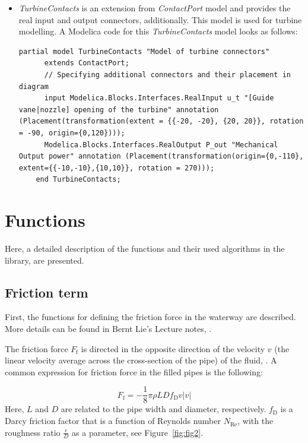 \documentclass[%
]{USN-PhD}
\begin{document}
\begin{itemize}
    \item \emph{TurbineContacts} is an extension from \emph{ContactPort} model and provides the real input and output connectors, additionally. This model is used for turbine modelling. A Modelica code for this \emph{TurbineContacts} model looks as follows:
    \begin{lstlisting}[language = modelica]
    partial model TurbineContacts "Model of turbine connectors"
      extends ContactPort;
      // Specifying additional connectors and their placement in diagram
      input Modelica.Blocks.Interfaces.RealInput u_t "[Guide vane|nozzle] opening of the turbine" annotation (Placement(transformation(extent = {{-20, -20}, {20, 20}}, rotation = -90, origin={0,120})));
      Modelica.Blocks.Interfaces.RealOutput P_out "Mechanical Output power" annotation (Placement(transformation(origin={0,-110}, extent={{-10,-10},{10,10}}, rotation = 270)));
    end TurbineContacts;
    \end{lstlisting}
\end{itemize}

\section{Functions}

Here, a detailed description of the functions and their used algorithms in the library, are presented.

\subsection{Friction term}

First, the functions for defining the friction force in the waterway are described. More details can be found in Bernt Lie's Lecture notes, \cite{LieL:18}.

The friction force $F_\mathrm{f}$ is directed in the opposite direction of the velocity $v$ (the linear velocity average across the cross-section of the pipe) of the fluid, \cite{LieL:18}. A common expression for friction force in the filled pipes is the following:

\begin{equation}\label{eq:eq1}
    F_\mathrm{f}=-\frac{1}{8}\pi\rho LDf_\mathrm{D}v|v|
\end{equation}
Here, $L$ and $D$ are related to the pipe width and diameter, respectively. $f_\mathrm{D}$ is a Darcy friction factor that is a function of Reynolds number $N_\mathrm{Re}$, with the roughness ratio $\frac{\epsilon}{D}$ as a parameter, see Figure~\ref{fig:fig2}.
\end{document}
